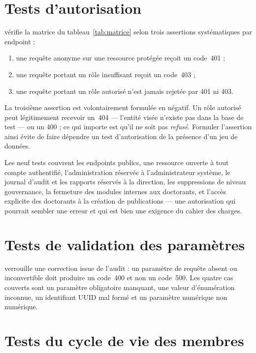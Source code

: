 \section{Tests d'autorisation}

 vérifie la matrice du
tableau~\ref{tab:matrice} selon trois assertions systématiques par endpoint :

\begin{enumerate}
  \item une requête anonyme sur une ressource protégée reçoit un code~401 ;
  \item une requête portant un rôle insuffisant reçoit un code~403 ;
  \item une requête portant un rôle autorisé n'est jamais rejetée par 401 ni 403.
\end{enumerate}

La troisième assertion est volontairement formulée en négatif. Un rôle autorisé peut
légitimement recevoir un~404 --- l'entité visée n'existe pas dans la base de test --- ou un
400 ; ce qui importe est qu'il ne soit pas \emph{refusé}. Formuler l'assertion ainsi évite
de faire dépendre un test d'autorisation de la présence d'un jeu de données.

Les neuf tests couvrent les endpoints publics, une ressource ouverte à tout compte
authentifié, l'administration réservée à l'administrateur système, le journal d'audit et
les rapports réservés à la direction, les suppressions de niveau gouvernance, la fermeture
des modules internes aux doctorants, et l'accès explicite des doctorants à la création de
publications --- une autorisation qui pourrait sembler une erreur et qui est bien une
exigence du cahier des charges.

\section{Tests de validation des paramètres}

 verrouille une correction issue de l'audit : un paramètre de
requête absent ou inconvertible doit produire un code~400 et non un code~500. Les quatre
cas couverts sont un paramètre obligatoire manquant, une valeur d'énumération inconnue, un
identifiant UUID mal formé et un paramètre numérique non numérique.

\section{Tests du cycle de vie des membres}

